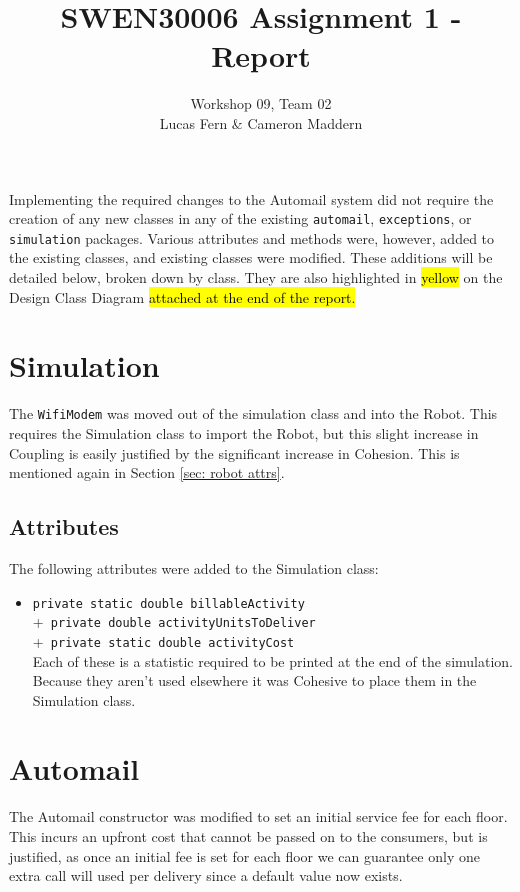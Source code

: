 \documentclass{article}
\title{\vspace{-1.5cm}SWEN30006 Assignment 1 - Report}
\date{}
\author{Workshop 09, Team 02\\Lucas Fern \& Cameron Maddern}
\begin{document}
\maketitle
\noindent Implementing the required changes to the Automail system did not require the creation of any new classes in any of the existing \verb|automail|, \verb|exceptions|, or \verb|simulation| packages. Various attributes and methods were, however, added to the existing classes, and existing classes were modified. These additions will be detailed below, broken down by class. They are also highlighted in \hl{yellow} on the Design Class Diagram \hl{attached at the end of the report.}

\section{Simulation}
The \verb|WifiModem| was moved out of the simulation class and into the Robot. This requires the Simulation class to import the Robot, but this slight increase in Coupling is easily justified by the significant increase in Cohesion. This is mentioned again in Section \ref{sec: robot attrs}. 
\subsection{Attributes}
The following attributes were added to the Simulation class:
\begin{itemize}
    \item \verb|private static double billableActivity|\\
         +\verb| private double activityUnitsToDeliver|\\
         +\verb| private static double activityCost|\\[2mm]
    Each of these is a statistic required to be printed at the end of the simulation. Because they aren't used elsewhere it was Cohesive to place them in the Simulation class.
\end{itemize}

\section{Automail}
The Automail constructor was modified to set an initial service fee for each floor. This incurs an upfront cost that cannot be passed on to the consumers, but is justified, as once an initial fee is set for each floor we can guarantee only one extra call will used per delivery since a default value now exists.
\end{document}
